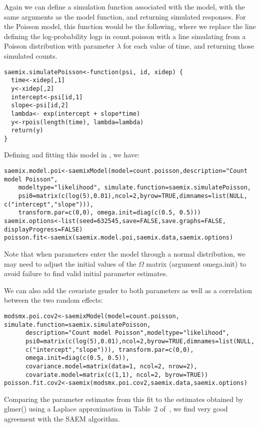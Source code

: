 Again we can define a simulation function associated with the model, with the same arguments as the model function, and returning simulated responses. For the Poisson model, this function would be the following, where we replace the line defining the log-probability {\sf logp} in {\sf count.poisson} with a line simulating from a Poisson distribution with parameter $\lambda$ for each value of time, and returning those simulated counts.
\begin{verbatim}
saemix.simulatePoisson<-function(psi, id, xidep) {
  time<-xidep[,1]
  y<-xidep[,2]
  intercept<-psi[id,1]
  slope<-psi[id,2]
  lambda<- exp(intercept + slope*time)
  y<-rpois(length(time), lambda=lambda)
  return(y)
}
\end{verbatim}

Defining and fitting this model in \monolix, we have:
\begin{verbatim}
saemix.model.poi<-saemixModel(model=count.poisson,description="Count model Poisson",
    modeltype="likelihood", simulate.function=saemix.simulatePoisson,
    psi0=matrix(c(log(5),0.01),ncol=2,byrow=TRUE,dimnames=list(NULL, c("intercept","slope"))), 
    transform.par=c(0,0), omega.init=diag(c(0.5, 0.5)))
saemix.options<-list(seed=632545,save=FALSE,save.graphs=FALSE, displayProgress=FALSE)
poisson.fit<-saemix(saemix.model.poi,saemix.data,saemix.options)
\end{verbatim}
Note that when parameters enter the model through a normal distribution, we may need to adjust the initial values of the $\Omega$ matrix (argument {\sf omega.init}) to avoid failure to find valid initial parameter estimates.

We can also add the covariate gender to both parameters as well as a correlation between the two random effects:
\begin{verbatim}
modsmx.poi.cov2<-saemixModel(model=count.poisson, simulate.function=saemix.simulatePoisson,
      description="Count model Poisson",modeltype="likelihood",   
      psi0=matrix(c(log(5),0.01),ncol=2,byrow=TRUE,dimnames=list(NULL, 
      c("intercept","slope"))), transform.par=c(0,0), 
      omega.init=diag(c(0.5, 0.5)), 
      covariance.model=matrix(data=1, ncol=2, nrow=2),
      covariate.model=matrix(c(1,1), ncol=2, byrow=TRUE))
poisson.fit.cov2<-saemix(modsmx.poi.cov2,saemix.data,saemix.options)
\end{verbatim}
Comparing the parameter estimates from this fit to the estimates obtained by {\sf glmer()} using a Laplace approximation in Table~2 of~\cite{Atkins13}, we find very good agreement with the SAEM algorithm.

